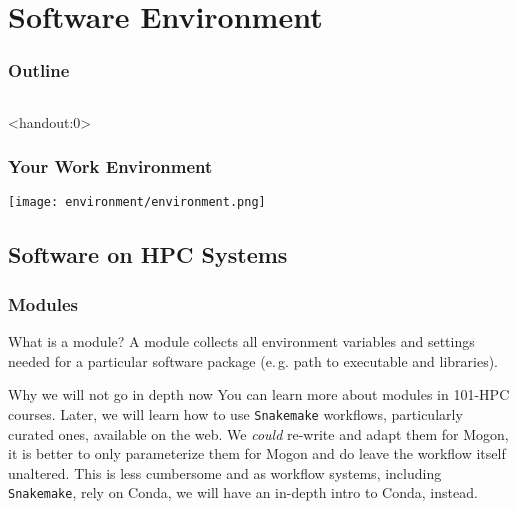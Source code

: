 \section{Software Environment}

\begin{frame}
    \frametitle{Outline}
    \begin{columns}[t]
        \begin{column}{.5\textwidth}
            \tableofcontents[sections={1-9},currentsection]
        \end{column}
        \begin{column}{.5\textwidth}
            \tableofcontents[sections={10-18},currentsection]
        \end{column}
    \end{columns}
\end{frame}

\begin{frame}<handout:0> 
  \frametitle{Your Work Environment}
  \centering
  \texttt{[image: environment/environment.png]}
\end{frame}

\subsection{Software on HPC Systems}

\begin{frame}[fragile]
  \frametitle{Modules}
  \vspace{-1.3em}
  \begin{block}{What is a module?}
    A module collects all environment variables and settings needed for a particular software package (e.\,g. path to executable and libraries).
  \end{block}
  \vspace{-0.8em}
  \begin{alertblock}{Why we will not go in depth now}
You can learn more about modules in 101-HPC courses. Later, we will learn how to use \texttt{Snakemake} workflows, particularly curated ones, available on the web. We \emph{could} re-write and adapt them for Mogon, it is better to only parameterize them for Mogon and do leave the workflow itself unaltered. This is less cumbersome and as workflow systems, including \texttt{Snakemake}, rely on Conda, we will have an in-depth intro to Conda, instead.
  \end{alertblock}

  \vfill
\end{frame}




